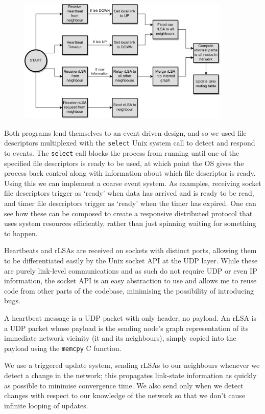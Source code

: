 \documentclass[withindex,glossary,openany]{cam-thesis}
\begin{document}
\begin{figure} \centering
	\includegraphics[width=0.9\textwidth]{flowchart_lsr}
	\label{fig:flowchart_lsr}
\end{figure}

Both programs lend themselves to an event-driven design, and so we used file descriptors multiplexed with the \texttt{select} Unix system call to detect and respond to events. The \texttt{select} call blocks the process from running until one of the specified file descriptors is ready to be used, at which point the OS gives the process back control along with information about which file descriptor is ready. Using this we can implement a coarse event system. As examples, receiving socket file descriptors trigger as `ready' when data has arrived and is ready to be read, and timer file descriptors trigger as `ready' when the timer has expired. One can see how these can be composed to create a responsive distributed protocol that uses system resources efficiently, rather than just spinning waiting for something to happen.

Heartbeats and rLSAs are received on sockets with distinct ports, allowing them to be differentiated easily by the Unix socket API at the UDP layer. While these are purely link-level communications and as such do not require UDP or even IP information, the socket API is an easy abstraction to use and allows me to reuse code from other parts of the codebase, minimising the possibility of introducing bugs.

A heartbeat message is a UDP packet with only header, no payload. An rLSA is a UDP packet whose payload is the sending node's graph representation of its immediate network vicinity (it and its neighbours), simply copied into the payload using the \texttt{memcpy} C function.

We use a triggered update system, sending rLSAs to our neighbours whenever we detect a change in the network;  this propagates link-state information as quickly as possible to minimise convergence time. We also send only when we detect changes with respect to our knowledge of the network so that we don't cause infinite looping of updates.
\end{document}
